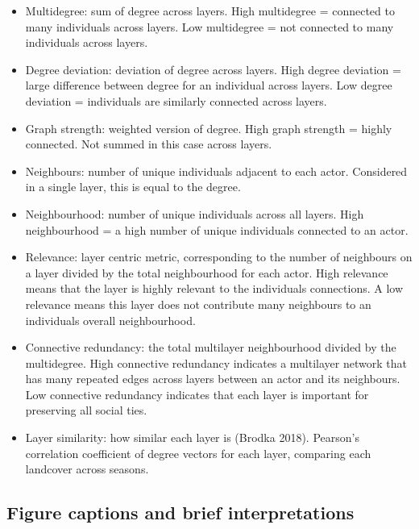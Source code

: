 \documentclass[]{article}
\begin{document}
\begin{itemize}
\item
  Multidegree: sum of degree across layers. High multidegree = connected to many
  individuals across layers. Low multidegree = not connected to many individuals
  across layers.
\item
  Degree deviation: deviation of degree across layers. High degree deviation =
  large difference between degree for an individual across layers. Low degree
  deviation = individuals are similarly connected across layers.
\item
  Graph strength: weighted version of degree. High graph strength = highly
  connected. Not summed in this case across layers.
\item
  Neighbours: number of unique individuals adjacent to each actor. Considered in
  a single layer, this is equal to the degree.
\item
  Neighbourhood: number of unique individuals across all layers. High
  neighbourhood = a high number of unique individuals connected to an actor.
\item
  Relevance: layer centric metric, corresponding to the number of neighbours on a
  layer divided by the total neighbourhood for each actor. High relevance means
  that the layer is highly relevant to the individuals connections. A low
  relevance means this layer does not contribute many neighbours to an individuals
  overall neighbourhood.
\item
  Connective redundancy: the total multilayer neighbourhood divided by the
  multidegree. High connective redundancy indicates a multilayer network that has
  many repeated edges across layers between an actor and its neighbours. Low
  connective redundancy indicates that each layer is important for preserving all
  social ties.
\item
  Layer similarity: how similar each layer is (Brodka 2018). Pearson's
  correlation coefficient of degree vectors for each layer, comparing each
  landcover across seasons.
\end{itemize}

\hypertarget{figure-captions-and-brief-interpretations}{%
\subsection{Figure captions and brief interpretations}\label{figure-captions-and-brief-interpretations}}
\end{document}
